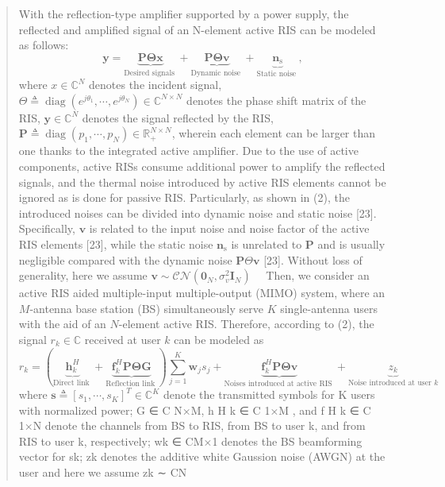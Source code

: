 \documentclass[UTF8]{ctexart}
\makeatletter
\newcommand{\boxspacing}{\kern\kvtcb@left@rule\kern\kvtcb@boxsep}
\newcommand{\prompt}[4]{
        {\ttfamily\llap{{\color{#2}[#3]:\hspace{3pt}#4}}\vspace{-\baselineskip}}
    }
\makeatother
\begin{document}
\begin{quote}
With the reflection-type amplifier supported by a power supply, the
reflected and amplified signal of an N-element active RIS can be modeled
as follows: \[
\mathbf{y}=\underbrace{\mathbf{P} \boldsymbol{\Theta} \mathbf{x}}_{\text {Desired signals }}+\underbrace{\mathbf{P \Theta} \mathbf{v}}_{\text {Dynamic noise }}+\underbrace{\mathbf{n}_{\mathrm{s}}}_{\text {Static noise }},
\] where \(x\in \mathbb{C}^N\) denotes the incident signal,
\(\Theta \triangleq \operatorname{diag}\left(e^{j \theta_{1}}, \cdots, e^{j \theta_{N}}\right) \in \mathbb{C}^{N \times N}\)
denotes the phase shift matrix of the RIS,
\(\mathbf{y} \in \mathbb{C}^N\) denotes the signal reflected by the RIS,
\(\mathbf{P} \triangleq \operatorname{diag}\left(p_{1}, \cdots, p_{N}\right) \in \mathbb{R}_{+}^{N \times N}\),
wherein each element can be larger than one thanks to the integrated
active amplifier. Due to the use of active components, active RISs
consume additional power to amplify the reflected signals, and the
thermal noise introduced by active RIS elements cannot be ignored as is
done for passive RIS. Particularly, as shown in (2), the introduced
noises can be divided into dynamic noise and static noise {[}23{]}.
Specifically, \(\mathbf{v}\) is related to the input noise and noise
factor of the active RIS elements {[}23{]}, while the static noise
\(\mathbf{n}_\text{s}\) is unrelated to \(\mathbf{P}\) and is usually
negligible compared with the dynamic noise
\(\mathbf{P} \Theta \mathbf{v}\) {[}23{]}. Without loss of generality,
here we assume
\(\mathbf{v} \sim \mathcal{C} \mathcal{N}\left(\mathbf{0}_{N}, \sigma_{v}^{2} \mathbf{I}_{N}\right)\)
 Then, we consider an active RIS aided multiple-input multiple-output
(MIMO) system, where an \(M\)-antenna base station (BS) simultaneously
serve \(K\) single-antenna users with the aid of an \(N\)-element active
RIS. Therefore, according to (2), the signal \(r_k \in \mathbb{C}\)
received at user \(k\) can be modeled as \[
r_{k}=(\underbrace{\mathbf{h}_{k}^{H}}_{\text {Direct link }}+\underbrace{\mathbf{f}_{k}^{H} \mathbf{P} \boldsymbol{\Theta} \mathbf{G}}_{\text {Reflection link }}) \sum_{j=1}^{K} \mathbf{w}_{j} s_{j}+\underbrace{\mathbf{f}_{k}^{H} \mathbf{P} \mathbf{\Theta} \mathbf{v}}_{\text {Noises introduced at active RIS }}+\underbrace{z_{k}}_{\text {Noise introduced at user } k}
\] where
\(\mathbf{s} \triangleq\left[s_{1}, \cdots, s_{K}\right]^{T} \in \mathbb{C}^{K}\)
denote the transmitted symbols for K users with normalized power; G ∈ C
N×M, h H k ∈ C 1×M , and f H k ∈ C 1×N denote the channels from BS to
RIS, from BS to user k, and from RIS to user k, respectively; wk ∈ CM×1
denotes the BS beamforming vector for sk; zk denotes the additive white
Gaussion noise (AWGN) at the user and here we assume zk ∼ CN
\end{quote}

    \begin{tcolorbox}[breakable, size=fbox, boxrule=1pt, pad at break*=1mm,colback=cellbackground, colframe=cellborder]
\prompt{In}{incolor}{ }{\boxspacing}
\begin{Verbatim}[commandchars=\\\{\}]

\end{Verbatim}
\end{tcolorbox}


    
    
    
\end{document}
